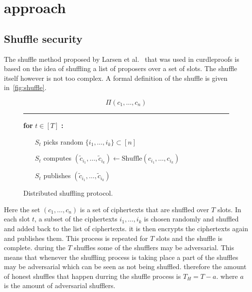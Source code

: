 \section{approach}\label{sec:approach}


\subsection{Shuffle security}\label{sec:approach-shuffle-security}
The shuffle method proposed by Larsen et al.~\cite{cryptoeprint:2022/560} that was used in curdleproofs is based on the idea of shuffling a list of proposers over a set of slots.
The shuffle itself however is not too complex.
A formal definition of the shuffle is given in~\autoref{fig:shuffle}.

\begin{figure}[ht]\label{fig:shuffle}

    \begin{framed}
        \[
            \Pi(c_1, \ldots, c_n)
        \]
        \rule{\linewidth}{0.4pt}

        \noindent
        \textbf{for} $t \in [T]$ \textbf{:}
        \begin{itemize}
            \item[$S_t$] picks random $\{i_1, \ldots, i_k\} \subset [n]$
            \item[$S_t$] computes $(\tilde{c}_{i_1}, \ldots, \tilde{c}_{i_k}) \leftarrow \text{Shuffle}(c_{i_1}, \ldots, c_{i_k})$
            \item[$S_t$] publishes $(\tilde{c}_{i_1}, \ldots, \tilde{c}_{i_k})$
        \end{itemize}
    \end{framed}
    \caption{Distributed shuffling protocol.}
\end{figure}

Here the set $(c_1, \ldots, c_n)$ is a set of ciphertexts that are shuffled over $T$ slots.
In each slot $t$, a subset of the ciphertexts ${i_1, \ldots, i_k}$ is chosen randomly and shuffled and added back to the list of ciphertexts.
it is then encrypts the ciphertexts again and publishes them.
This process is repeated for $T$ slots and the shuffle is complete.
during the $T$ shuffles some of the shufflers may be adversarial.
This means that whenever the shuffling process is taking place a part of the shuffles may be adversarial which can be seen as not being shuffled.
therefore the amount of honest shuffles that happen durring the shuffle process is $T_H = T - a$.
where $a$ is the amount of adversarial shufflers.

